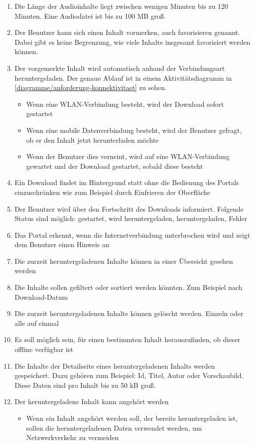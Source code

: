 \begin{enumerate}
    \item Die Länge der Audioinhalte liegt zwischen wenigen Minuten bis zu 120 Minuten. Eine Audiodatei ist bis zu 100 \ac{MB} groß. 
	\item Der Benutzer kann sich einen Inhalt vormerken, auch favorisieren genannt. Dabei gibt es keine Begrenzung, wie viele Inhalte insgesamt favorisiert werden können. 
	\item Der vorgemerkte Inhalt wird automatisch anhand der Verbindungsart heruntergeladen. Der genaue Ablauf ist in einem Aktivitätsdiagramm in \autoref{diagramme/anforderung-konnektivitaet} zu sehen.
	
	\begin{itemize}
		\item Wenn eine WLAN-Verbindung besteht, wird der Download sofort gestartet
		\item Wenn eine mobile Datenverbindung besteht, wird der Benutzer gefragt, ob er den Inhalt jetzt herunterladen möchte
		\item Wenn der Benutzer dies verneint, wird auf eine WLAN-Verbindung gewartet und der Download gestartet, sobald diese besteht
	\end{itemize}
	

	\item Ein Download findet im Hintergrund statt ohne die Bedienung des Portals einzuschränken wie zum Beispiel durch Einfrieren der Oberfläche
	\item Der Benutzer wird über den Fortschritt des Downloads informiert. Folgende Status sind möglich: gestartet, wird heruntergeladen, heruntergeladen, Fehler
	\item Das Portal erkennt, wenn die Internetverbindung unterbrochen wird und zeigt dem Benutzer einen Hinweis an
	\item Die zurzeit heruntergeladenen Inhalte können in einer Übersicht gesehen werden
	\item Die Inhalte sollen gefiltert oder sortiert werden könnten. Zum Beispiel nach Download-Datum
 	\item Die zurzeit heruntergeladenen Inhalte können gelöscht werden. Einzeln oder alle auf einmal
	\item Es soll möglich sein, für einen bestimmten Inhalt herauszufinden, ob dieser offline verfügbar ist
	\item Die Inhalte der Detailseite eines heruntergeladenen Inhalts werden gespeichert. Dazu gehören zum Beispiel: Id, Titel, Autor oder Vorschaubild. Diese Daten sind pro Inhalt bis zu 50 \ac{kB} groß.
	\item Der heruntergeladene Inhalt kann angehört werden
	\begin{itemize}
		\item Wenn ein Inhalt angehört werden soll, der bereits heruntergeladen ist, sollen die heruntergeladenen Daten verwendet werden, um Netzwerkverkehr zu vermeiden
	\end{itemize}
	
\end{enumerate}

